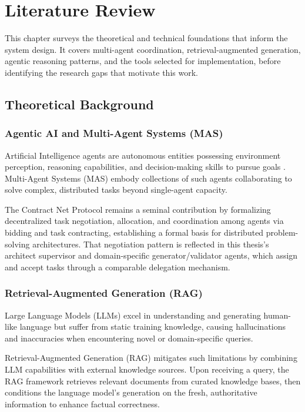 \chapter{Literature Review}

This chapter surveys the theoretical and technical foundations that inform the system design. It covers multi-agent coordination, retrieval-augmented generation, agentic reasoning patterns, and the tools selected for implementation, before identifying the research gaps that motivate this work.

\section{Theoretical Background}

\subsection{Agentic AI and Multi-Agent Systems (MAS)}

Artificial Intelligence agents are autonomous entities possessing environment perception, reasoning capabilities, and decision-making skills to pursue goals \cite{sycara1998multiagent}. Multi-Agent Systems (MAS) embody collections of such agents collaborating to solve complex, distributed tasks beyond single-agent capacity.

The Contract Net Protocol \cite{smith1980contract} remains a seminal contribution by formalizing decentralized task negotiation, allocation, and coordination among agents via bidding and task contracting, establishing a formal basis for distributed problem-solving architectures. That negotiation pattern is reflected in this thesis's architect supervisor and domain-specific generator/validator agents, which assign and accept tasks through a comparable delegation mechanism.

\subsection{Retrieval-Augmented Generation (RAG)}

Large Language Models (LLMs) excel in understanding and generating human-like language but suffer from static training knowledge, causing hallucinations and inaccuracies when encountering novel or domain-specific queries.

Retrieval-Augmented Generation (RAG) \cite{lewis2020rag} mitigates such limitations by combining LLM capabilities with external knowledge sources. Upon receiving a query, the RAG framework retrieves relevant documents from curated knowledge bases, then conditions the language model's generation on the fresh, authoritative information to enhance factual correctness.

